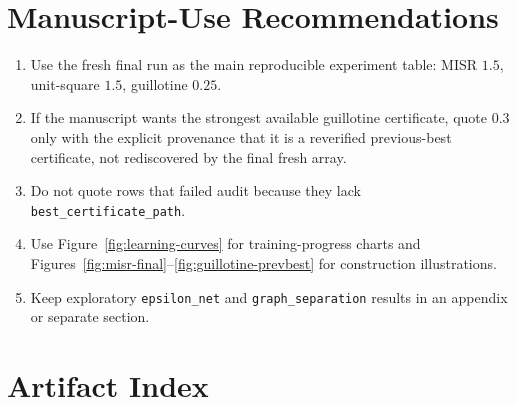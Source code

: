 \documentclass[11pt]{article}
\newcommand{\code}[1]{\texttt{#1}}
\begin{document}
\section{Manuscript-Use Recommendations}

\begin{enumerate}
\item Use the fresh final run as the main reproducible experiment table:
MISR $1.5$, unit-square $1.5$, guillotine $0.25$.
\item If the manuscript wants the strongest available guillotine certificate,
quote $0.3$ only with the explicit provenance that it is a reverified
previous-best certificate, not rediscovered by the final fresh array.
\item Do not quote rows that failed audit because they lack
\code{best\_certificate\_path}.
\item Use Figure~\ref{fig:learning-curves} for training-progress charts and
Figures~\ref{fig:misr-final}--\ref{fig:guillotine-prevbest} for construction
illustrations.
\item Keep exploratory \code{epsilon\_net} and \code{graph\_separation}
results in an appendix or separate section.
\end{enumerate}

\section{Artifact Index}
\end{document}
